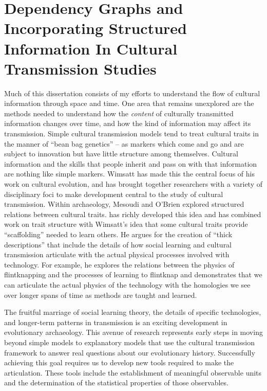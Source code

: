 \section{Dependency Graphs and Incorporating Structured Information In Cultural Transmission Studies}

Much of this dissertation consists of my efforts to understand the flow of cultural information through space and time. One area that remains unexplored are the methods needed to understand how the \emph{content} of culturally transmitted information changes over time, and how the kind of information may affect its transmission. Simple cultural transmission models tend to treat cultural traits in the manner of ``bean bag genetics'' – as markers which come and go and are subject to innovation but have little structure among themselves. Cultural information and the skills that people inherit and pass on with that information are nothing like simple markers. Wimsatt \citep{wimsatt2007reproducing,wimsatt2013articulating,Wimsatt2014,wimsatt2019articulating} has made this the central focus of his work on cultural evolution, and has brought  together researchers with a variety of disciplinary foci to make development central to the study of cultural transmission. Within archaeology, Mesoudi and O’Brien \citeyearpar{mesoudi2008learning} explored structured relations between cultural traits.  \citet{tostevin2019content} has richly developed this idea and has combined work on trait structure with Wimsatt’s idea that some cultural traits provide ``scaffolding'' needed to learn others. He argues for the creation of ``thick descriptions'' that include the details of how social learning and cultural transmission articulate with the actual physical processes involved with technology. For example, he explores the relations between the physics of flintknapping and the processes of learning to flintknap and demonstrates that we can articulate the actual physics of the technology with the homologies we see over longer spans of time as methods are taught and learned.

The fruitful marriage of social learning theory, the details of specific technologies, and longer-term patterns in transmission is an exciting development in evolutionary archaeology. This avenue of research represents early steps in moving beyond simple models to explanatory models that use the cultural transmission framework to answer real questions about our evolutionary history. Successfully achieving this goal requires us to develop new tools required to make the articulation. These tools include the establishment of meaningful observable units and the determination of the statistical properties of those observables. 

